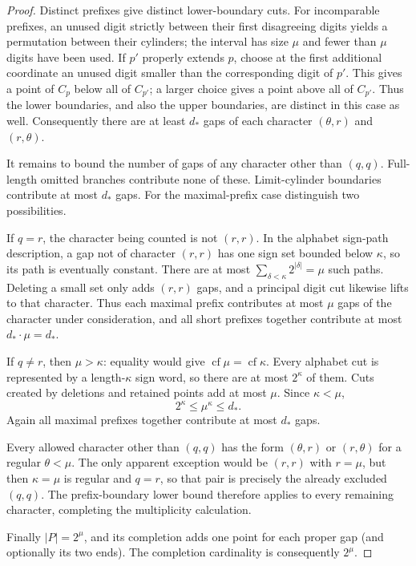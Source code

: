 \documentclass[11pt]{article}
\theoremstyle{definition}
\theoremstyle{remark}
\begin{document}
\begin{proof}
Distinct prefixes give distinct lower-boundary cuts.  For
incomparable prefixes, an unused digit strictly between their first
disagreeing digits yields a permutation between their cylinders;
the interval has size $\mu$ and fewer than $\mu$ digits have been used.
If $p'$ properly extends $p$, choose at the first additional coordinate
an unused digit smaller than the corresponding digit of $p'$.
This gives a point of $C_p$ below all of $C_{p'}$; a larger choice gives
a point above all of $C_{p'}$.  Thus the lower boundaries, and also
the upper boundaries, are distinct in this case as well.  Consequently
there are at least $d_*$ gaps of each character $(\theta,r)$ and
$(r,\theta)$.

It remains to bound the number of gaps of any character other than
$(q,q)$.  Full-length omitted branches contribute none of
these.  Limit-cylinder boundaries contribute at most $d_*$ gaps.
For the maximal-prefix case distinguish two possibilities.

If $q=r$, the character being counted is not $(r,r)$.
In the alphabet sign-path description, a gap not of character
$(r,r)$ has one sign set bounded below $\kappa$, so its path is
eventually constant.  There are at most
$\sum_{\delta<\kappa}2^{|\delta|}=\mu$ such paths.  Deleting a small
set only adds $(r,r)$ gaps, and a principal digit cut likewise
lifts to that character.  Thus each maximal prefix contributes at
most $\mu$ gaps of the character under consideration, and all short
prefixes together contribute at most $d_*\cdot\mu=d_*$.

If $q\ne r$, then $\mu>\kappa$: equality would give
$\operatorname{cf}\mu=\operatorname{cf}\kappa$.  Every alphabet cut
is represented by a length-$\kappa$ sign word, so there are at most
$2^\kappa$ of them.  Cuts created by deletions and retained points
add at most $\mu$.  Since $\kappa<\mu$,
\[
2^\kappa\le\mu^\kappa\le d_*.
\]
Again all maximal prefixes together contribute at most $d_*$ gaps.

Every allowed character other than $(q,q)$ has the form
$(\theta,r)$ or $(r,\theta)$ for a regular $\theta<\mu$.
The only apparent exception would be $(r,r)$ with $r=\mu$,
but then $\kappa=\mu$ is regular and $q=r$, so that pair is
precisely the already excluded $(q,q)$.
The prefix-boundary lower bound therefore applies to every remaining
character, completing the multiplicity calculation.

Finally $|P|=2^\mu$, and its completion adds one point for each
proper gap (and optionally its two ends).  The completion cardinality
is consequently $2^\mu$.
\end{proof}
\end{document}
